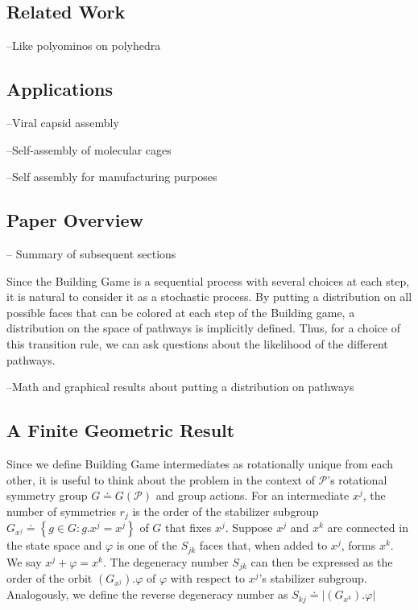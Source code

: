 \subsection{Related Work}
--Like polyominos on polyhedra

\subsection{Applications}
--Viral capsid assembly

--Self-assembly of molecular cages

--Self assembly for manufacturing purposes
\subsection{Paper Overview}
-- Summary of subsequent sections

Since the Building Game is a sequential process with several choices at each step, it is natural to consider it as a stochastic process. By putting a distribution on all possible faces that can be colored \spc at each step of the Building game, a distribution on the space of pathways is implicitly defined. Thus, for a choice of this transition rule, we can ask questions about the likelihood of the different pathways. 

--Math and graphical results about putting a distribution on pathways


\subsection{A Finite Geometric Result}

Since we define Building Game intermediates as rotationally unique from each other, it is useful to think about the problem in the context of $\mathscr{P}$'s rotational symmetry group $G \doteq G\left(\mathscr{P}\right)$ and group actions. For an intermediate $x^j$, the number of symmetries $r_j$ is the order of the stabilizer subgroup $G_{x^j} \doteq \left\{g \in G : g.x^j = x^j\right\}$ of $G$ that fixes $x^j$. Suppose $x^j$ and $x^k$ are connected in the state space and $\varphi$ is one of the $S_{jk}$ faces that, when added to $x^j$, forms $x^k$. We say $x^j + \varphi = x^k$. The degeneracy number $S_{jk}$ can then be expressed as the order of the orbit $\left(G_{x^j}\right).\varphi$ of $\varphi$ with respect to $x^j$'s stabilizer subgroup. Analogously, we define the reverse degeneracy number as $S_{kj} \doteq \left|\left(G_{x^k}\right).\varphi\right|$

